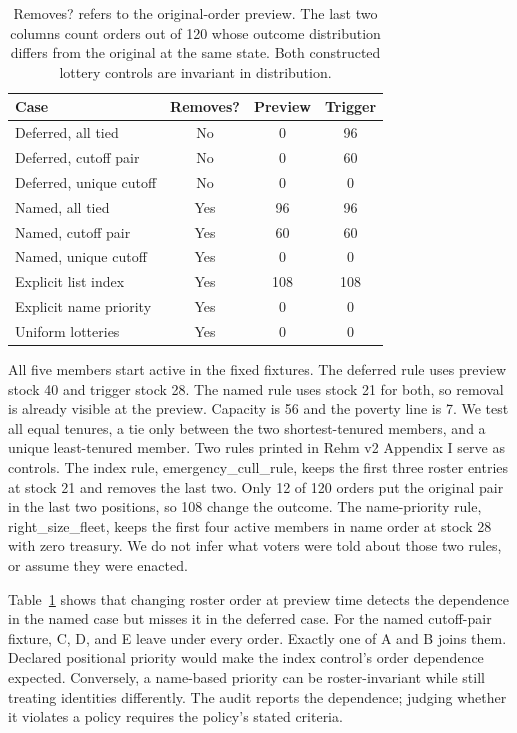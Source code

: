 \documentclass[letterpaper]{article}
\begin{document}
\begin{table}[t]
\centering
\begin{tabular}{@{}lccc@{}}
\toprule
Case & Removes? & Preview & Trigger \\
\midrule
Deferred, all tied & No & 0 & 96 \\
Deferred, cutoff pair & No & 0 & 60 \\
Deferred, unique cutoff & No & 0 & 0 \\
Named, all tied & Yes & 96 & 96 \\
Named, cutoff pair & Yes & 60 & 60 \\
Named, unique cutoff & Yes & 0 & 0 \\
Explicit list index & Yes & 108 & 108 \\
Explicit name priority & Yes & 0 & 0 \\
Uniform lotteries & Yes & 0 & 0 \\
\bottomrule
\end{tabular}
\caption{Removes? refers to the original-order preview. The last two columns count orders out of 120 whose outcome distribution differs from the original at the same state. Both constructed lottery controls are invariant in distribution.}
\label{tab:checks}
\end{table}

All five members start active in the fixed fixtures. The deferred rule uses preview stock 40 and trigger stock 28. The named rule uses stock 21 for both, so removal is already visible at the preview. Capacity is 56 and the poverty line is 7. We test all equal tenures, a tie only between the two shortest-tenured members, and a unique least-tenured member. Two rules printed in Rehm v2 Appendix I serve as controls. The index rule, \textnormal{emergency\_cull\_rule}, keeps the first three roster entries at stock 21 and removes the last two. Only 12 of 120 orders put the original pair in the last two positions, so 108 change the outcome. The name-priority rule, \textnormal{right\_size\_fleet}, keeps the first four active members in name order at stock 28 with zero treasury. We do not infer what voters were told about those two rules, or assume they were enacted.

Table~\ref{tab:checks} shows that changing roster order at preview time detects the dependence in the named case but misses it in the deferred case. For the named cutoff-pair fixture, C, D, and E leave under every order. Exactly one of A and B joins them. Declared positional priority would make the index control's order dependence expected. Conversely, a name-based priority can be roster-invariant while still treating identities differently. The audit reports the dependence; judging whether it violates a policy requires the policy's stated criteria.
\end{document}
